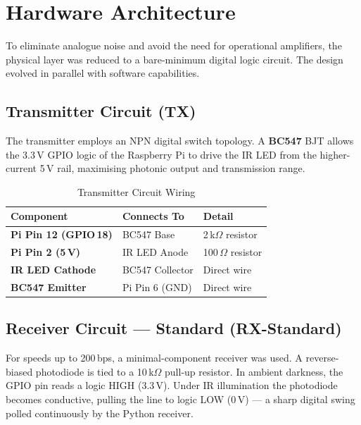 \documentclass[10pt, twocolumn, a4paper]{article}
\begin{document}
\section{Hardware Architecture}

To eliminate analogue noise and avoid the need for operational amplifiers, the physical layer was reduced to a bare-minimum digital logic circuit. The design evolved in parallel with software capabilities.

\subsection{Transmitter Circuit (TX)}

The transmitter employs an NPN digital switch topology. A \textbf{BC547} BJT allows the 3.3\,V GPIO logic of the Raspberry Pi to drive the IR LED from the higher-current 5\,V rail, maximising photonic output and transmission range.

\begin{table}[H]
\centering
\caption{Transmitter Circuit Wiring}
\label{tab:tx}
\renewcommand{\arraystretch}{1.2}
\begin{tabularx}{\linewidth}{@{}>{\bfseries}l l X@{}}
\toprule
Component & Connects To & Detail \\
\midrule
Pi Pin 12 (GPIO\,18) & BC547 Base    & 2\,k$\Omega$ resistor \\
Pi Pin 2 (5\,V)       & IR LED Anode  & 100\,$\Omega$ resistor \\
IR LED Cathode        & BC547 Collector & Direct wire \\
BC547 Emitter         & Pi Pin 6 (GND)  & Direct wire \\
\bottomrule
\end{tabularx}
\end{table}

\subsection{Receiver Circuit — Standard (RX-Standard)}

For speeds up to 200\,bps, a minimal-component receiver was used. A reverse-biased photodiode is tied to a 10\,k$\Omega$ pull-up resistor. In ambient darkness, the GPIO pin reads a logic HIGH (3.3\,V). Under IR illumination the photodiode becomes conductive, pulling the line to logic LOW (0\,V) — a sharp digital swing polled continuously by the Python receiver.
\end{document}
